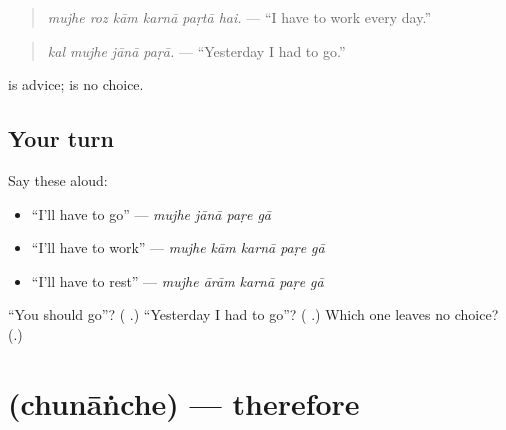 \begin{quote}
\textbf{     }
\end{quote}

\begin{quote}
\emph{mujhe roz kām karnā paṛtā hai.} — \textquotedblleft{}I have to work every day.\textquotedblright{}
\end{quote}

\begin{quote}
\textbf{   }
\end{quote}

\begin{quote}
\emph{kal mujhe jānā paṛā.} — \textquotedblleft{}Yesterday I had to go.\textquotedblright{}
\end{quote}

\textbf{} is advice; \textbf{} is no choice.

\subsection*{Your turn}
Say these aloud:

\begin{itemize}
\raggedright
  \item \textquotedblleft{}I'll have to go\textquotedblright{} — \emph{mujhe jānā paṛe gā}
  \item \textquotedblleft{}I'll have to work\textquotedblright{} — \emph{mujhe kām karnā paṛe gā}
  \item \textquotedblleft{}I'll have to rest\textquotedblright{} — \emph{mujhe ārām karnā paṛe gā}
\end{itemize}

\begin{tcolorbox}[breakable,colback=teal!4,colframe=teal!35!black,title={Before you move on}]
\textquotedblleft{}You should go\textquotedblright{}? (\textbf{   }.) \textquotedblleft{}Yesterday I had to go\textquotedblright{}? (\textbf{   }.) Which one leaves no choice? (\textbf{}.)
\end{tcolorbox}
\section[\texorpdfstring{\ur{چنانچہ} (chunāṅche)}{چنانچہ (chunāṅche)}]{ (chunāṅche) — therefore}

\label{lesson:UR-C269-chunanche}



